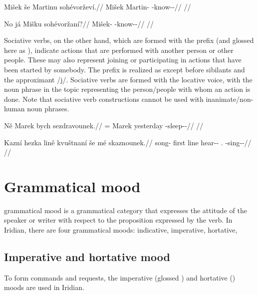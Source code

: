 \pex
\begingl
\gla Mišek še Martinu sohévorževí.//
\glb Mišek \Com{} Martin-\Ins{} \Rec{}-know-\Av{}-\Cont{}//
\glft {}//
\endgl
\xe

\pex
\begingl
\gla No já Mišku sohévoržaní?//
\glb \Q{}  Mišek-\Ins{} \Rec{}-know-\Av{}-\Ret{}//
\glft {}//
\endgl
\xe

Sociative verbs, on the other hand, which are formed with
the prefix  (and glossed here as \Soc{}), indicate actions that are
performed with another person or other people. These may also represent joining
or participating in actions that have been started by somebody. The prefix
 is realized as  except before sibilants and the approximant
/j/. Sociative verbs are formed with the locative voice, with the noun phrase in
the topic representing the person/people with whom an action is done. Note that
sociative verb constructions cannot be used with inanimate/non-human noun
phrases.

\pex
\begingl
\gla Ně Marek bych sezdravounek.//
\glb \Pl{}= Marek yesterday \Soc{}-sleep-\Lv{}-\Pf{}//
\glft {}//
\endgl
\xe

\pex
\begingl
\gla Kazní hezka lině kvuštnaní še m\'e skaznounek.//
\glb song-\Gen{} first line hear-\Pv{}-\Ret{} \Com{} \First\Pl{}.\Str{} \Soc{}-sing-\Lv{}-\Pf{}//
\glft {}//
\endgl
\xe

\section{Grammatical mood}\label{sec:mood}

{\sc grammatical mood} is a grammatical category that expresses the attitude of the speaker or writer with respect to the proposition expressed by the verb. In Iridian, there are four grammatical moods: indicative, imperative, hortative,


\subsection{Imperative and hortative
mood}\label{sec:imp-hort}

To form commands and requests, the imperative
(glossed \Imp{}) and hortative () moods are used in Iridian.

